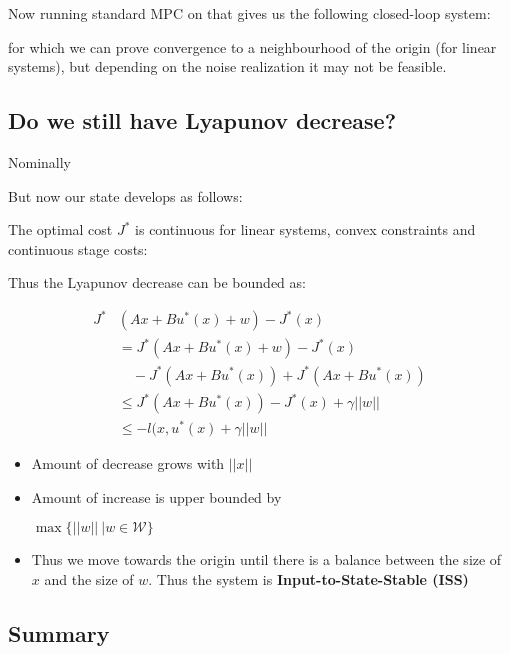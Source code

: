 \documentclass[8pt,a4paper]{scrartcl}
\begin{document}
\begin{multicols*}{3}
Now running standard MPC on that gives us the following closed-loop system:


for which we can prove convergence to a neighbourhood of the origin (for linear systems), but depending on the noise realization it may not be feasible.

\subsection{Do we still have Lyapunov decrease?}

Nominally


But now our state develops as follows:


The optimal cost $J^\ast$ is continuous for linear systems, convex constraints and continuous stage costs:


Thus the Lyapunov decrease can be bounded as:

\begin{align*}
J^\ast&(Ax+Bu^\ast(x)+w)-J^\ast(x)\\
&=J^\ast(Ax+Bu^\ast(x)+w)-J^\ast(x)\\
&\quad-J^\ast(Ax+Bu^\ast(x))+J^\ast(Ax+Bu^\ast(x))\\
&\leq J^\ast(Ax+Bu^\ast(x))-J^\ast(x)+\gamma||w||\\
&\leq -l(x,u^\ast(x)+\gamma||w||
\end{align*}

\begin{itemize}
\item Amount of decrease grows with $||x||$
\item Amount of increase is upper bounded by 

$\max\{||w||\ |w\in\mathcal{W}\}$
\item Thus we move towards the origin until there is a balance between the size of $x$ and the size of $w$. Thus the system is \textbf{Input-to-State-Stable (ISS)}
\end{itemize}


\subsection{Summary}


\end{multicols*}
\end{document}
